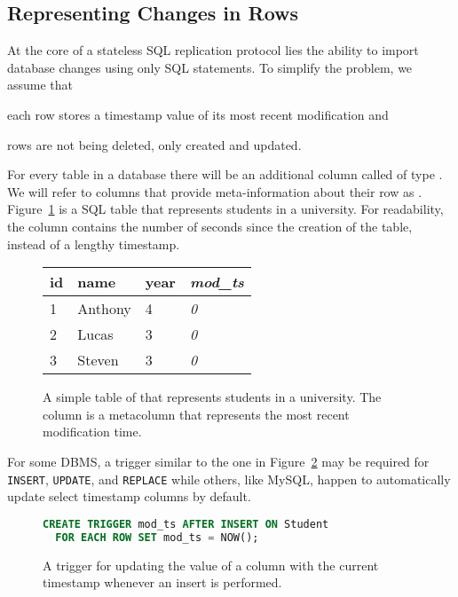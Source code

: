 \subsection{Representing Changes in Rows}  \label{sec:changes}

At the core of a stateless SQL replication protocol lies the ability to import
database changes using only SQL statements. To simplify the problem, we assume that
\begin{inparaenum}
\item each row stores a timestamp value of its most recent modification and
\item rows are not being deleted, only created and updated.
\end{inparaenum}
For every table in a database there will be an additional column called
\modts of type . We will refer to columns that provide
meta-information about their row as .
Figure~\ref{fig:student_init} is a SQL table that represents students in a
university. For readability, the \modts column contains the number of seconds
since the creation of the table, instead of a lengthy timestamp.

\begin{figure}[h!]
\center
\begin{tabular}{ l  l  l  l }
id  & name      & year  & \textit{mod\_ts} \\
\hline
1   & Anthony   & 4     & \textit{0}        \\
2   & Lucas     & 3     & \textit{0}        \\
3   & Steven    & 3     & \textit{0}        \\
\end{tabular}
\caption{A simple table of that represents students in a university. The \modts
column is a metacolumn that represents the most recent modification time.}
\label{fig:student_init}
\end{figure}

For some DBMS, a trigger similar to the one in Figure~\ref{fig:student_trigger}
may be required for \texttt{INSERT}, \texttt{UPDATE}, and \texttt{REPLACE} while
others, like MySQL, happen to automatically update select timestamp columns by
default\cite{_mysql_????-2}.

\begin{figure}[h!]
\begin{lstlisting}[language=sql]
CREATE TRIGGER mod_ts AFTER INSERT ON Student
  FOR EACH ROW SET mod_ts = NOW();
\end{lstlisting}
\caption{A trigger for updating the value of a \modts column with the current
timestamp whenever an insert is performed.}
\label{fig:student_trigger}
\end{figure}

